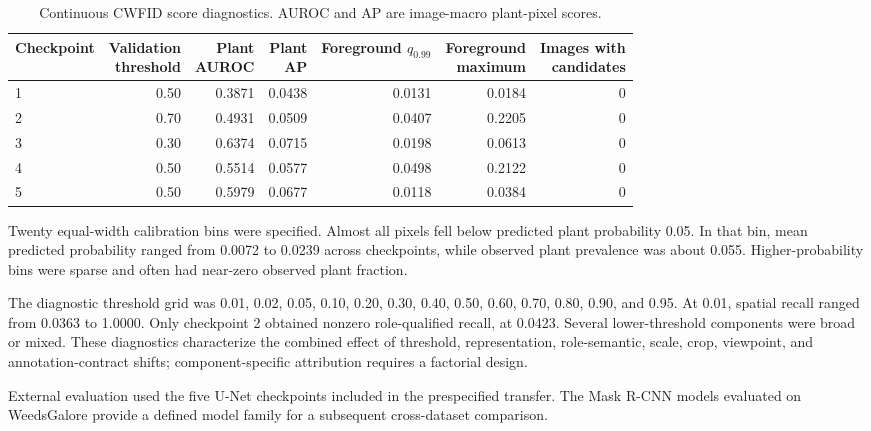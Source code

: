 \documentclass[preprint,12pt]{elsarticle}
\begin{document}
\begin{table}[htbp]
\centering
\caption{Continuous CWFID score diagnostics. AUROC and AP are image-macro plant-pixel scores.}
\label{tab:s9continuous}
\footnotesize
\setlength{\tabcolsep}{4pt}
\begin{tabular}{lrrrrrr}
\toprule
Checkpoint & \shortstack{Validation\\threshold} & \shortstack{Plant\\AUROC} & \shortstack{Plant\\AP} & \shortstack{Foreground\\$q_{0.99}$} & \shortstack{Foreground\\maximum} & \shortstack{Images with\\candidates} \\
\midrule
1 & 0.50 & 0.3871 & 0.0438 & 0.0131 & 0.0184 & 0 \\
2 & 0.70 & 0.4931 & 0.0509 & 0.0407 & 0.2205 & 0 \\
3 & 0.30 & 0.6374 & 0.0715 & 0.0198 & 0.0613 & 0 \\
4 & 0.50 & 0.5514 & 0.0577 & 0.0498 & 0.2122 & 0 \\
5 & 0.50 & 0.5979 & 0.0677 & 0.0118 & 0.0384 & 0 \\
\bottomrule
\end{tabular}
\end{table}

Twenty equal-width calibration bins were specified. Almost all pixels fell below predicted plant probability 0.05. In that bin, mean predicted probability ranged from 0.0072 to 0.0239 across checkpoints, while observed plant prevalence was about 0.055. Higher-probability bins were sparse and often had near-zero observed plant fraction.

The diagnostic threshold grid was 0.01, 0.02, 0.05, 0.10, 0.20, 0.30, 0.40, 0.50, 0.60, 0.70, 0.80, 0.90, and 0.95. At 0.01, spatial recall ranged from 0.0363 to 1.0000. Only checkpoint 2 obtained nonzero role-qualified recall, at 0.0423. Several lower-threshold components were broad or mixed. These diagnostics characterize the combined effect of threshold, representation, role-semantic, scale, crop, viewpoint, and annotation-contract shifts; component-specific attribution requires a factorial design.

External evaluation used the five U-Net checkpoints included in the prespecified transfer. The Mask R-CNN models evaluated on WeedsGalore provide a defined model family for a subsequent cross-dataset comparison.
\end{document}

